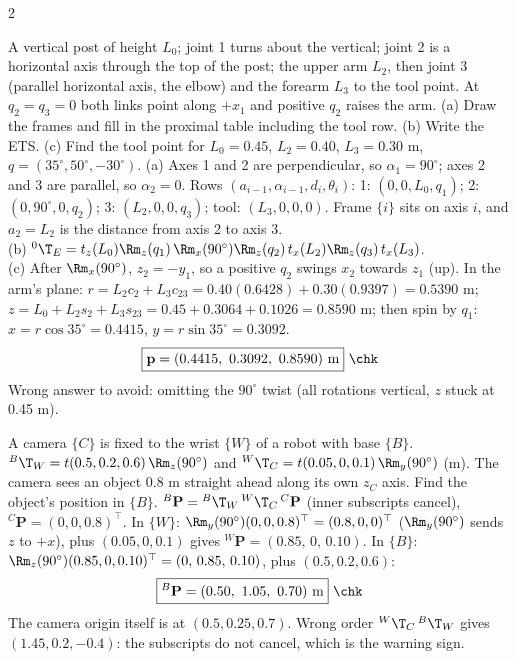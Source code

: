 \begin{multicols}{2}
\begin{examq}
A vertical post of height $L_0$; joint 1 turns about the vertical; joint 2 is a horizontal axis through the top of the post; the upper arm $L_2$, then joint 3 (parallel horizontal axis, the elbow) and the forearm $L_3$ to the tool point. At $q_2=q_3=0$ both links point along $+x_1$ and positive $q_2$ raises the arm. (a) Draw the frames and fill in the proximal table including the tool row. (b) Write the ETS. (c) Find the tool point for $L_0=0.45$, $L_2=0.40$, $L_3=0.30$ m, $q=(35^\circ,50^\circ,-30^\circ)$.
\solution
(a) Axes 1 and 2 are perpendicular, so $\alpha_1=90^\circ$; axes 2 and 3 are parallel, so $\alpha_2=0$. Rows $(a_{i-1},\alpha_{i-1},d_i,\theta_i)$: 1: $(0,0,L_0,q_1)$; 2: $(0,90^\circ,0,q_2)$; 3: $(L_2,0,0,q_3)$; tool: $(L_3,0,0,0)$. Frame $\{i\}$ sits on axis $i$, and $a_2=L_2$ is the distance from axis 2 to axis 3.\\
(b) ${}^0\T_E=t_z(L_0)\Rm_z(q_1)\,\Rm_x(90^\circ)\Rm_z(q_2)\,t_x(L_2)\Rm_z(q_3)\,t_x(L_3)$.\\
(c) After $\Rm_x(90^\circ)$, $z_2=-y_1$, so a positive $q_2$ swings $x_2$ towards $z_1$ (up). In the arm's plane: $r=L_2c_2+L_3c_{23}=0.40(0.6428)+0.30(0.9397)=0.5390$ m; $z=L_0+L_2s_2+L_3s_{23}=0.45+0.3064+0.1026=0.8590$ m; then spin by $q_1$: $x=r\cos35^\circ=0.4415$, $y=r\sin35^\circ=0.3092$.
\[\boxed{\mathbf p=(0.4415,\ 0.3092,\ 0.8590)\ \text{m}}\ \chk\]
Wrong answer to avoid: omitting the $90^\circ$ twist (all rotations vertical, $z$ stuck at 0.45 m).
\end{examq}

\begin{examq}
A camera $\{C\}$ is fixed to the wrist $\{W\}$ of a robot with base $\{B\}$. ${}^B\T_W=t(0.5,0.2,0.6)\,\Rm_z(90^\circ)$ and ${}^W\T_C=t(0.05,0,0.1)\,\Rm_y(90^\circ)$ (m). The camera sees an object 0.8 m straight ahead along its own $z_C$ axis. Find the object's position in $\{B\}$.
\solution
${}^B\mathbf P={}^B\T_W\,{}^W\T_C\,{}^C\mathbf P$ (inner subscripts cancel), ${}^C\mathbf P=(0,0,0.8)^\top$. In $\{W\}$: $\Rm_y(90^\circ)(0,0,0.8)^\top=(0.8,0,0)^\top$ ($\Rm_y(90^\circ)$ sends $z$ to $+x$), plus $(0.05,0,0.1)$ gives ${}^W\mathbf P=(0.85,\,0,\,0.10)$. In $\{B\}$: $\Rm_z(90^\circ)(0.85,0,0.10)^\top=(0,\,0.85,\,0.10)$, plus $(0.5,0.2,0.6)$:
\[\boxed{{}^B\mathbf P=(0.50,\ 1.05,\ 0.70)\ \text{m}}\ \chk\]
The camera origin itself is at $(0.5,0.25,0.7)$. Wrong order ${}^W\T_C\,{}^B\T_W$ gives $(1.45,0.2,-0.4)$: the subscripts do not cancel, which is the warning sign.
\end{examq}


\end{multicols}
